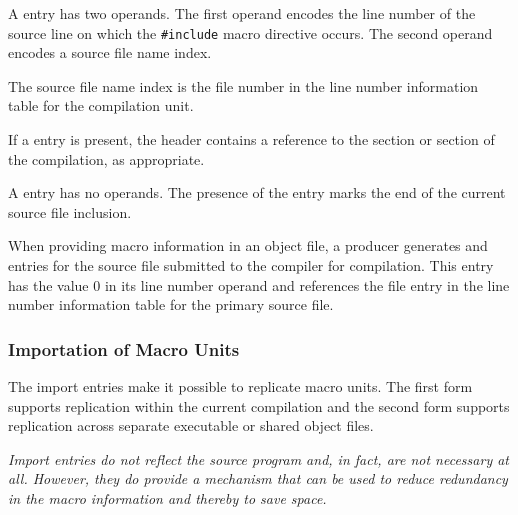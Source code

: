 \begin{enumerate}[1. ]

\itembfnl{\DWMACROstartfileTARG{}}
A \DWMACROstartfileNAME{} entry has two operands. The
first operand encodes the line number of the source line on
which the \texttt{\#include} macro directive occurs. 
The second operand encodes a source file name index. 

The source file name index is the file number in the 
line number information table for the compilation unit.

If a \DWMACROstartfileNAME{} entry is present, the header
contains a reference to the \dotdebugline{} section 
\bb
or \dotdebuglinedwo{} section of the compilation, as appropriate.
\eb

\itembfnl{\DWMACROendfileTARG{}}
A \DWMACROendfileNAME{} entry has no operands. The presence of
the entry marks the end of the current source file inclusion.

\end{enumerate}

When providing macro information in an object file,
a producer generates \DWMACROstartfile{} and
\DWMACROendfile{} entries for the source file submitted to
the compiler for compilation. This \DWMACROstartfile{} entry
has the value 0 in its line number operand and references
the file entry in the line number information table for the
primary source file.

\subsubsection{Importation of Macro Units}
\label{chap:importationofmacrounits}
The import entries make it possible to replicate macro units.
The first form supports replication within the current compilation
and the second form supports replication across separate 
executable or shared object files.

\textit{Import entries do not reflect the source program
and, in fact, are not necessary at all. However, they do
provide a mechanism that can be used to reduce redundancy
in the macro information and thereby to save space.}

